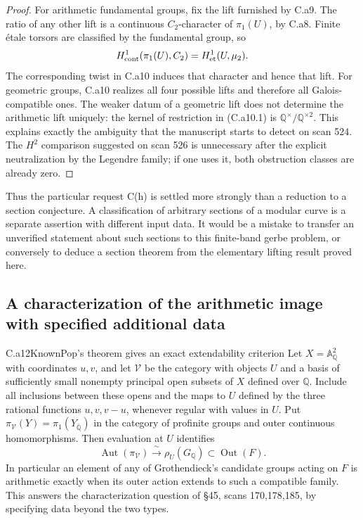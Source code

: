 \begin{proof}
For arithmetic fundamental groups, fix the lift furnished by C.a9.
The ratio of any other lift is a continuous $C_2$-character of
$\pi_1(U)$, by C.a8. Finite \'etale torsors are classified by the
fundamental group, so
\[
 H^1_{\rm cont}(\pi_1(U),C_2)=H^1_{\rm et}(U,\mu_2).
\]
The corresponding twist in C.a10 induces that character and hence that
lift. For geometric groups, C.a10 realizes all four possible lifts and
therefore all Galois-compatible ones. The weaker datum of a geometric
lift does not determine the arithmetic lift uniquely: the kernel of
restriction in (C.a10.1) is
$\mathbb Q^{\times}/\mathbb Q^{\times2}$. This explains exactly the
ambiguity that the manuscript starts to detect on scan 524. The
$H^2$ comparison suggested on scan 526 is unnecessary after the explicit
neutralization by the Legendre family; if one uses it, both obstruction
classes are already zero.
\end{proof}
Thus the particular request C(h) is settled more strongly than a reduction
to a section conjecture. A classification of arbitrary sections of a
modular curve is a separate assertion with different input data. It would
be a mistake to transfer an unverified statement about such sections to
this finite-band gerbe problem, or conversely to deduce a section theorem
from the elementary lifting result proved here.

\subsection{A characterization of the arithmetic image with specified additional data}

\begin{claim}{C.a12}{Known}{Pop's theorem gives an exact extendability criterion}
Let $X=\mathbb A^2_{\mathbb Q}$ with coordinates $u,v$, and let
$\mathcal V$ be the category with objects $U$ and a basis of sufficiently
small nonempty principal open subsets of $X$ defined over $\mathbb Q$.
Include all inclusions between these opens and the maps to $U$ defined
by the three rational functions $u,v,v-u$, whenever regular with values
in $U$. Put $\pi_{\mathcal V}(Y)=\pi_1(Y_{\overline{\mathbb Q}})$ in
the category of profinite groups and outer continuous homomorphisms.
Then evaluation at $U$ identifies
\[
 \operatorname{Aut}(\pi_{\mathcal V})\xrightarrow{\ \sim\ }
 \rho_U(G_{\mathbb Q})\subset\operatorname{Out}(F).
 \tag{C.a12.1}
\]
In particular an element of any of Grothendieck's candidate groups
acting on $F$ is arithmetic exactly when its outer action extends to
such a compatible family. This answers the characterization question
of \S45, scans 170,178,185, by specifying data beyond the two types.
\end{claim}

